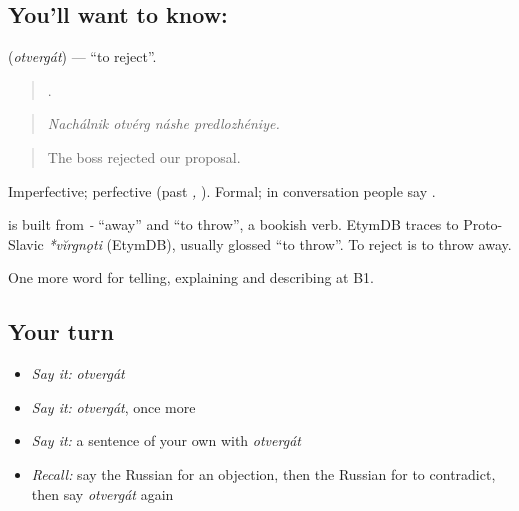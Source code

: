 \subsection*{You'll want to know: }
\textbf{} (\emph{otvergát}) — \textquotedblleft{}to reject\textquotedblright{}.

\begin{quote}
   .
\end{quote}

\begin{quote}
\emph{Nachálnik otvérg náshe predlozhéniye.}
\end{quote}

\begin{quote}
The boss rejected our proposal.
\end{quote}

Imperfective; perfective \emph{} (past \emph{, }). Formal; in conversation people say \emph{ }.

\begin{cousinweb}
\textbf{} is built from \emph{-} \textquotedblleft{}away\textquotedblright{} and \emph{} \textquotedblleft{}to throw\textquotedblright{}, a bookish verb. EtymDB traces \emph{} to Proto-Slavic \emph{*vĭrgnǫti} (EtymDB), usually glossed \textquotedblleft{}to throw\textquotedblright{}. To reject is to throw away.
\end{cousinweb}

\begin{grammarlens}[title={What you've built}]
One more word for telling, explaining and describing at B1.
\end{grammarlens}

\subsection*{Your turn}
\begin{itemize}
\raggedright
  \item \emph{Say it:} \emph{otvergát}
  \item \emph{Say it:} \emph{otvergát}, once more
  \item \emph{Say it:} a sentence of your own with \emph{otvergát}
  \item \emph{Recall:} say the Russian for an objection, then the Russian for to contradict, then say \emph{otvergát} again
\end{itemize}

